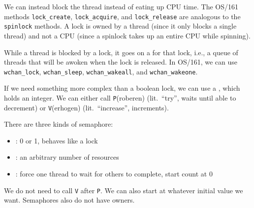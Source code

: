 We can instead block the thread instead of eating up CPU time.
The OS/161 methods \texttt{lock_create},
\texttt{lock_acquire}, and \texttt{lock_release}
are analogous to the \texttt{spinlock} methods.
A lock is owned by a thread (since it only blocks a single thread)
and not a CPU (since a spinlock takes up an entire CPU while spinning).

While a thread is blocked by a lock,
it goes on a  for that lock, i.e.,
a queue of threads that will be awoken when the lock is released.
In OS/161, we can use \texttt{wchan_lock}, \texttt{wchan_sleep},
\texttt{wchan_wakeall}, and \texttt{wchan_wakeone}.

If we need something more complex than a boolean lock,
we can use a , which holds an integer.
We can either call \texttt{P}(roberen) (lit.\ ``try'', waits until able to decrement)
or \texttt{V}(erhogen) (lit.\ ``increase'', increments).

There are three kinds of semaphore:
\begin{itemize}[nosep]
  \item {}: 0 or 1, behaves like a lock
  \item {}: an arbitrary number of resources
  \item {}: force one thread to wait for others to complete, start count at 0
\end{itemize}
We do not need to call \texttt{V} after \texttt{P}.
We can also start at whatever initial value we want.
Semaphores also do not have owners.

